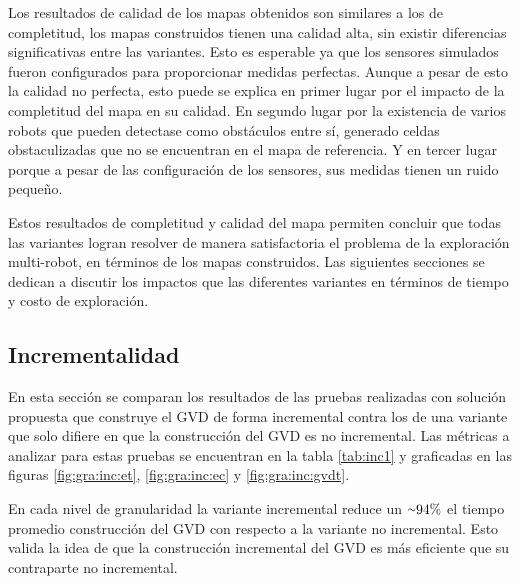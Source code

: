 Los resultados de calidad de los mapas obtenidos son similares a los de
completitud, los mapas construidos tienen una calidad alta, sin existir
diferencias significativas entre las variantes. Esto es esperable ya que
los sensores simulados fueron configurados para proporcionar medidas perfectas.
Aunque a pesar de esto la calidad no perfecta, esto puede se explica en primer
lugar por el impacto de la completitud del mapa en su calidad. En segundo lugar
por la existencia de varios robots que pueden detectase como obstáculos entre
sí, generado celdas obstaculizadas que no se encuentran en el mapa de
referencia. Y en tercer lugar porque a pesar de las configuración de los
sensores, sus medidas tienen un ruido pequeño.

Estos resultados de completitud y calidad del mapa permiten concluir que todas
las variantes logran resolver de manera satisfactoria el problema de la
exploración multi-robot, en términos de los mapas construidos. Las
siguientes secciones se dedican a discutir los impactos que las diferentes
variantes en términos de tiempo y costo de exploración.




\subsection{Incrementalidad}\label{sec:exp:inc}
En esta sección se comparan los resultados de las pruebas realizadas con
solución propuesta que construye el GVD de forma incremental contra los de una
variante que solo difiere en que la construcción del GVD es no incremental. Las
métricas a analizar para estas pruebas se encuentran en la tabla \ref{tab:inc1}
y graficadas en las figuras \ref{fig:gra:inc:et}, \ref{fig:gra:inc:ec} y
\ref{fig:gra:inc:gvdt}.

En cada nivel de granularidad la variante incremental reduce un
${\smallsim}94\%$ el tiempo promedio construcción del GVD con respecto a la
variante no incremental. Esto valida la idea de que la construcción incremental
del GVD es más eficiente que su contraparte no incremental.

